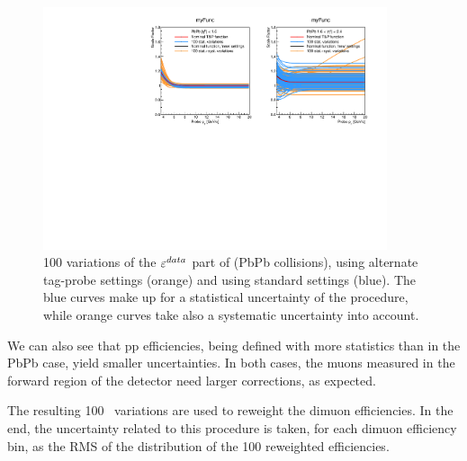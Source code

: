 \begin{figure}
  \begin{center}
    \includegraphics[width=0.9\textwidth]{Chapters/aCorrection/TNP_pbpb_100variations_newSettings_15-001.pdf}
    \caption{
      100 variations of the $\varepsilon^{data}$ part of \Ctnp (PbPb collisions), using alternate
      tag-probe settings (orange) and using standard settings
      (blue). The blue curves make up for a statistical uncertainty of
      the procedure, while orange curves take also a systematic
      uncertainty into account.
    }
    \label{fig:tnpVar_PbPb}
  \end{center}
\end{figure}

We can also see that pp efficiencies, being defined with more
statistics than in the PbPb case, yield smaller uncertainties. In both
cases, the muons measured in the forward region of the detector need
larger corrections, as expected.



The resulting 100 \Ctnp\ variations are used to reweight the dimuon
efficiencies. In the end, the uncertainty related to this
procedure is taken, for each dimuon efficiency bin, as the RMS of the
distribution of the 100 reweighted efficiencies. 


